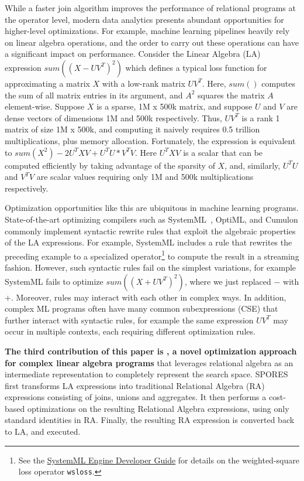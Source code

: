 While a faster join algorithm improves the performance of 
 relational programs at the operator level,
 modern data analytics presents abundant opportunities
 for higher-level optimizations.
For example, machine learning pipelines heavily rely on 
 linear algebra operations,
 and the order to carry out these operations
 can have a significant impact on performance.
Consider the Linear Algebra (LA) expression $sum((X-UV^T)^2)$ which
defines a typical loss function for approximating a matrix $X$ with a
low-rank matrix $UV^T$. Here, $sum()$ computes the sum of all matrix
entries in its argument, and $A^2$ squares the matrix $A$
element-wise. Suppose $X$ is a sparse, 1M x 500k matrix, and suppose
$U$ and $V$ are dense vectors of dimensions 1M and 500k respectively.
Thus, $UV^T$ is a rank 1 matrix of size 1M x 500k, and computing it
naively requires 0.5 trillion multiplications, plus memory allocation.
Fortunately, the expression is equivalent to
$sum(X^2) - 2U^TXV + U^TU * V^TV$.  Here $U^TXV$ is a scalar that can
be computed efficiently by taking advantage of the sparsity of $X$,
and, similarly, $U^TU$ and $V^TV$ are scalar values requiring only 1M
and 500k multiplications respectively.

Optimization opportunities like this are ubiquitous in machine
learning programs. State-of-the-art optimizing compilers such as
SystemML~\cite{DBLP:reference/bdt/Boehm19},
OptiML\cite{DBLP:conf/icml/SujeethLBRCWAOO11}, and
Cumulon\cite{DBLP:conf/sigmod/HuangB013} commonly implement syntactic
rewrite rules that exploit the algebraic properties of the LA
expressions. For example, SystemML includes a rule that rewrites the
preceding example to a specialized operator\footnote{See the
  \href{https://systemml.apache.org/docs/0.12.0/engine-dev-guide.html}{SystemML
    Engine Developer Guide} for details on the weighted-square loss
  operator \texttt{wsloss}. } to compute the result in a streaming
fashion.  However, such syntactic rules fail on the simplest
variations, for example SystemML fails to optimize $sum((X+UV^T)^2)$,
where we just replaced $-$ with $+$.  Moreover, rules may interact
with each other in complex ways.  In addition, complex ML programs
often have many common subexpressions (CSE) that further interact
with syntactic rules, for example the same expression $UV^T$ may occur
in multiple contexts, each requiring different optimization rules.

\textbf{The third contribution of this paper is \sys, a novel optimization approach for
complex linear algebra programs} that leverages relational algebra as
an intermediate representation to completely represent the search
space.
SPORES first transforms LA expressions into traditional
Relational Algebra (RA) expressions consisting of joins, unions 
and aggregates.  It then performs a cost-based optimizations on
the resulting Relational Algebra expressions, using only standard
identities in RA.  Finally, the resulting RA expression is converted
back to LA, and executed.

